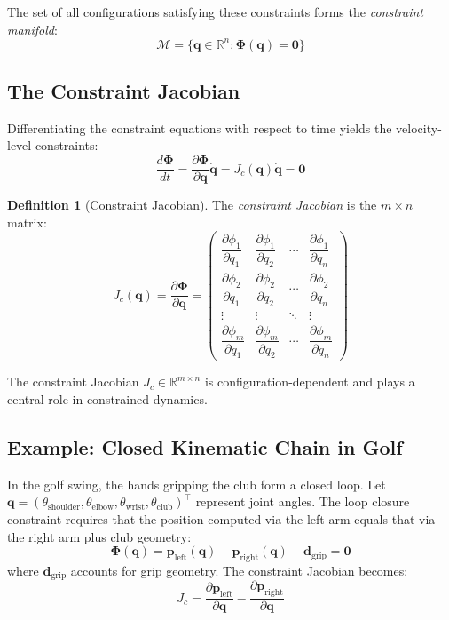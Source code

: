 \documentclass[11pt,a4paper]{article}
\theoremstyle{definition}
\newtheorem{definition}{Definition}[section]
\newcommand{\R}{\mathbb{R}}
\newcommand{\Jc}{J_c}
\newcommand{\qvec}{\bm{q}}
\newcommand{\Phivec}{\bm{\Phi}}
\begin{document}
The set of all configurations satisfying these constraints forms the \emph{constraint manifold}:
\begin{equation}
    \mathcal{M} = \{\qvec \in \R^n : \Phivec(\qvec) = \bm{0}\}
\end{equation}

\subsection{The Constraint Jacobian}

Differentiating the constraint equations with respect to time yields the velocity-level constraints:
\begin{equation}
    \frac{d\Phivec}{dt} = \frac{\partial \Phivec}{\partial \qvec} \dot{\qvec} = \Jc(\qvec) \dot{\qvec} = \bm{0}
\end{equation}

\begin{definition}[Constraint Jacobian]
The \emph{constraint Jacobian} is the $m \times n$ matrix:
\begin{equation}
    \boxed{\Jc(\qvec) = \frac{\partial \Phivec}{\partial \qvec} = 
    \begin{pmatrix}
        \dfrac{\partial \phi_1}{\partial q_1} & \dfrac{\partial \phi_1}{\partial q_2} & \cdots & \dfrac{\partial \phi_1}{\partial q_n} \\[1em]
        \dfrac{\partial \phi_2}{\partial q_1} & \dfrac{\partial \phi_2}{\partial q_2} & \cdots & \dfrac{\partial \phi_2}{\partial q_n} \\[0.5em]
        \vdots & \vdots & \ddots & \vdots \\[0.5em]
        \dfrac{\partial \phi_m}{\partial q_1} & \dfrac{\partial \phi_m}{\partial q_2} & \cdots & \dfrac{\partial \phi_m}{\partial q_n}
    \end{pmatrix}}
\end{equation}
\end{definition}

The constraint Jacobian $\Jc \in \R^{m \times n}$ is configuration-dependent and plays a central role in constrained dynamics.

\subsection{Example: Closed Kinematic Chain in Golf}

In the golf swing, the hands gripping the club form a closed loop. Let $\qvec = (\theta_{\text{shoulder}}, \theta_{\text{elbow}}, \theta_{\text{wrist}}, \theta_{\text{club}})^\top$ represent joint angles. The loop closure constraint requires that the position computed via the left arm equals that via the right arm plus club geometry:
\begin{equation}
    \Phivec(\qvec) = \bm{p}_{\text{left}}(\qvec) - \bm{p}_{\text{right}}(\qvec) - \bm{d}_{\text{grip}} = \bm{0}
\end{equation}
where $\bm{d}_{\text{grip}}$ accounts for grip geometry. The constraint Jacobian becomes:
\begin{equation}
    \Jc = \frac{\partial \bm{p}_{\text{left}}}{\partial \qvec} - \frac{\partial \bm{p}_{\text{right}}}{\partial \qvec}
\end{equation}
\end{document}
